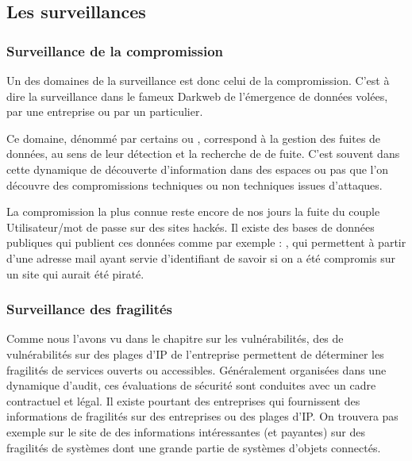 


\subsection{Les surveillances} 


\subsubsection{Surveillance de la compromission}

Un des domaines de la surveillance est donc celui de la compromission. C'est à dire la surveillance dans le fameux Darkweb de l'émergence de données volées,  par une entreprise ou par un particulier.

Ce domaine, dénommé par certains  ou , correspond à la gestion des fuites de données, au sens de leur détection et la recherche de  de fuite. C'est souvent dans cette dynamique de découverte d'information  dans des espaces  ou pas que l'on découvre des compromissions techniques ou non techniques issues d'attaques.

La compromission la plus connue reste encore de nos jours  la fuite du couple Utilisateur/mot de passe sur des sites hackés. Il existe des bases de données publiques qui publient ces données  comme par exemple : , qui permettent à partir d'une adresse mail ayant servie d'identifiant de savoir si on a été compromis sur un site qui aurait été piraté.

\subsubsection{Surveillance des fragilités}

Comme nous l'avons vu dans le chapitre sur les vulnérabilités,  des  de vulnérabilités sur des plages d'IP de l'entreprise permettent de déterminer les fragilités de services ouverts ou accessibles. Généralement organisées dans une dynamique d'audit, ces évaluations de sécurité sont conduites avec un cadre contractuel et légal. Il existe pourtant des entreprises qui fournissent des informations de fragilités sur des entreprises ou des plages d'IP. On trouvera pas exemple sur le site de  des informations intéressantes (et payantes) sur des fragilités de systèmes dont une grande partie de systèmes d'objets connectés.

